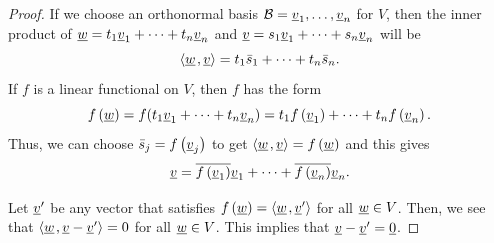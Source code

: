 \begin{proof}
If we choose an orthonormal basis $\mathcal{B} = \underline{v}_1, \ldots, \underline{v}_n$ for $V$, then the inner product of $\underline{w} = t_1 \underline{v}_1 + \cdots + t_n \underline{v}_n$ and $\underline{v} = s_1 \underline{v}_1 + \cdots + s_n \underline{v}_n$ will be
\begin{equation*}
{\left\langle  \underline{w}  \mskip2mu ,  \underline{v}  \right\rangle} = t_1 \bar{s}_1 + \cdots + t_n \bar{s}_n .
\end{equation*}
If $f$ is a linear functional on $V$, then $f$ has the form
\begin{equation*}
f \left(\underline{w}\right) = f(t_1 \underline{v}_1 + \cdots + t_n \underline{v}_n) = t_1 f \left( \underline{v}_1 \right) + \cdots + t_n f \left( \underline{v}_n \right).
\end{equation*}
Thus, we can choose $\bar{s}_j = f \left( \underline{v}_j \right)$ to get $ {\left\langle  \underline{w}  \mskip2mu ,  \underline{v}  \right\rangle} = f \left( \underline{w} \right)$ and this gives
\begin{equation*}
\underline{v} = \overline{ f \left( \underline{v}_1 \right) } \underline{v}_1 + \cdots + \overline{ f \left( \underline{v}_n \right) } \underline{v}_n .
\end{equation*}

Let $\underline{v}'$ be any vector that satisfies $f \left( \underline{w} \right) = {\left\langle  \underline{w}  \mskip2mu ,  \underline{v}'  \right\rangle}$ for all $\underline{w}\in V$.
Then, we see that ${\left\langle  \underline{w}  \mskip2mu ,  \underline{v} - \underline{v}'  \right\rangle} = 0$
for all $\underline{w}\in V$.
This implies that $\underline{v}-\underline{v}' = \underline{0}$.

\end{proof}
